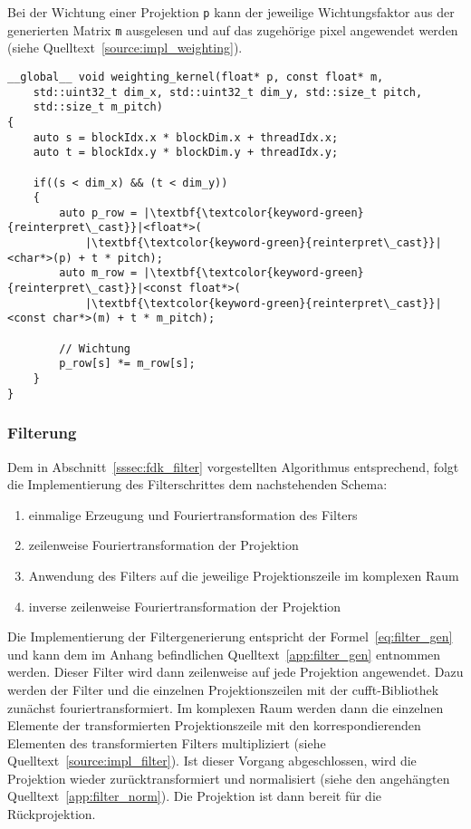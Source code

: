 Bei der Wichtung einer Projektion \texttt{p} kann der jeweilige Wichtungsfaktor aus der generierten Matrix \texttt{m}
ausgelesen und auf das zugehörige \gls{pixel} angewendet werden (siehe Quelltext~\ref{source:impl_weighting}). 

\begin{code}
\begin{verbatim}
__global__ void weighting_kernel(float* p, const float* m,
    std::uint32_t dim_x, std::uint32_t dim_y, std::size_t pitch,
    std::size_t m_pitch)
{
    auto s = blockIdx.x * blockDim.x + threadIdx.x;
    auto t = blockIdx.y * blockDim.y + threadIdx.y;

    if((s < dim_x) && (t < dim_y))
    {
        auto p_row = |\textbf{\textcolor{keyword-green}{reinterpret\_cast}}|<float*>(
            |\textbf{\textcolor{keyword-green}{reinterpret\_cast}}|<char*>(p) + t * pitch);
        auto m_row = |\textbf{\textcolor{keyword-green}{reinterpret\_cast}}|<const float*>(
            |\textbf{\textcolor{keyword-green}{reinterpret\_cast}}|<const char*>(m) + t * m_pitch);

        // Wichtung
        p_row[s] *= m_row[s];
    }
}
\end{verbatim}
\label{source:impl_weighting}
\end{code}

\subsubsection{Filterung}

Dem in Abschnitt~\ref{sssec:fdk_filter} vorgestellten Algorithmus entsprechend, folgt die Implementierung des
Filterschrittes dem nachstehenden Schema:

\begin{enumerate}
    \item einmalige Erzeugung und Fouriertransformation des Filters
    \item zeilenweise Fouriertransformation der Projektion
    \item Anwendung des Filters auf die jeweilige Projektionszeile im komplexen Raum
    \item inverse zeilenweise Fouriertransformation der Projektion
\end{enumerate}

Die Implementierung der Filtergenerierung entspricht der Formel~\ref{eq:filter_gen} und kann dem im Anhang befindlichen
Quelltext~\ref{app:filter_gen} entnommen werden. Dieser Filter wird dann zeilenweise auf jede Projektion angewendet.
Dazu werden der Filter und die einzelnen Projektionszeilen mit der \gls{cufft}-Bibliothek zunächst fouriertransformiert.
Im komplexen Raum werden dann die einzelnen Elemente der transformierten Projektionszeile mit den korrespondierenden
Elementen des transformierten Filters multipliziert (siehe Quelltext~\ref{source:impl_filter}). Ist dieser Vorgang
abgeschlossen, wird die Projektion wieder zurücktransformiert und normalisiert (siehe den angehängten
Quelltext~\ref{app:filter_norm}). Die Projektion ist dann bereit für die Rückprojektion.

